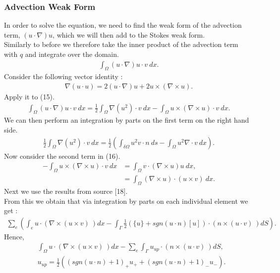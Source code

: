 \documentclass[11pt,twoside,a4paper]{article}
\begin{document}
\subsubsection{Advection Weak Form}
In order to solve the equation, we need to find the weak form of the advection term, $(u \cdot \nabla) u$, which we will then add to the Stokes weak form.\\
Similarly to before we therefore take the inner product of the advection term with $q$ and integrate over the domain.
\begin{align}
\int_\Omega (u \cdot \nabla)u \cdot v \ dx .
\end{align}
Consider the following vector identity :
\begin{align*}
\nabla (u \cdot u) = 2 (u \cdot \nabla) u + 2 u \times (\nabla \times u) .
\end{align*}
Apply it to (15).
\begin{align}
\int_\Omega (u \cdot \nabla)u \cdot v \ dx = \frac{1}{2} \int_\Omega \nabla (u^2) \cdot v \ dx - \int_{\Omega} u \times (\nabla \times u) \cdot v \ dx .
\end{align}
We can then perform an integration by parts on the first term on the right hand side.
\begin{align}
 \frac{1}{2} \int_\Omega \nabla (u^2) \cdot v \ dx = \frac{1}{2} (\int_{\delta \Omega } u^2 v \cdot n \ ds - \int_\Omega u^2 \nabla \cdot v \ dx) .
\end{align}
Now consider the second term in (16).
\begin{align*}
- \int_{\Omega} u \times (\nabla \times u) \cdot v \ dx &= \int_{\Omega} v \cdot (\nabla \times u) u \ dx,  \\
&=  \int_{\Omega} (\nabla \times u) \cdot (u \times v)  \ dx .
\end{align*}
Next we use the results from source [18].\\
From this we obtain that via integration by parts on each individual element we get :
\begin{align*}
\sum_e ( \int_e u \cdot (\nabla \times (u \times v) \ ) dx - \int_{\Gamma} \frac{1}{2}(\{u\} + sgn(u \cdot n)[u]) \cdot (n \times (u \cdot v) \ ) dS ) .
\end{align*}
Hence,
\begin{align}
&\int_\Omega u \cdot (\nabla \times (u \times v) \ ) dx -  \sum_e \int_{\Gamma} u_{up} \cdot (n \times (u \cdot v) \ ) dS, \\
& u_{up} = \frac{1}{2}((sgn(u \cdot n) + 1)_+ u_+ + (sgn (u \cdot n) +1)_- u_-) .
\end{align}
\end{document}
